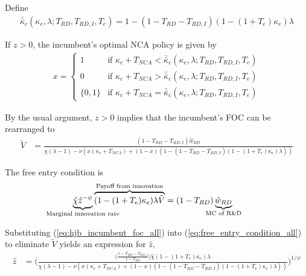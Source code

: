 \documentclass[11pt,english]{article}
\begin{document}
Define
\begin{align}
\bar{\bar{\kappa}}_c(\kappa_e,\lambda;T_{RD},T_{RD,I},T_e) = 1 - (1-T_{RD} - T_{RD,I})(1-(1+T_e)\kappa_e)\lambda  \label{eq:barkappa_all}
\end{align} 

If $z > 0$, the incumbent's optimal NCA policy is given by 
\begin{align}
x = \begin{cases}
1 & \textrm{if } \kappa_{c} + T_{NCA} < \bar{\bar{\kappa}}_c (\kappa_e, \lambda;T_{RD},T_{RD,I},T_e)\\
0 & \textrm{if } \kappa_{c} + T_{NCA} > \bar{\bar{\kappa}}_c (\kappa_e, \lambda;T_{RD},T_{RD,I},T_e)\\
\{0,1\} & \textrm{if } \kappa_c + T_{NCA} = \bar{\bar{\kappa}}_c (\kappa_e, \lambda;T_{RD},T_{RD,I},T_e)
\end{cases} \label{eq:nca_policy_all}
\end{align}


By the usual argument, $z > 0$ implies that the incumbent's FOC can be rearranged to
\begin{align}
\tilde{V} &= \frac{(1-T_{RD} - T_{RD,I})\hat{w}_{RD}}{\chi(\lambda -1) - \nu (x(\kappa_c + T_{NCA}) + (1-x)(1 - (1-T_{RD} - T_{RD,I})(1-(1+T_e)\kappa_e)\lambda)) } \label{eq:hjb_incumbent_foc_all}
\end{align}

The free entry condition is
\begin{align}
\underbrace{\hat{\chi} \hat{z}^{-\psi}}_{\mathclap{\text{Marginal innovation rate}}} \overbrace{(1-(1+T_e)\kappa_e) \lambda \tilde{V}}^{\mathclap{\text{Payoff from innovation}}} &= (1-T_{RD})\underbrace{\hat{w}_{RD}}_{\mathclap{\text{MC of R\&D}}} \label{eq:free_entry_condition_all}
\end{align}

Substituting (\ref{eq:hjb_incumbent_foc_all}) into (\ref{eq:free_entry_condition_all}) to eliminate $\tilde{V}$ yields an expression for $\hat{z}$, 
\begin{align}
\hat{z} &= \Bigg( \frac{\Big(\frac{1-T_{RD} -T_{RD,I}}{1-T_{RD}} \Big)\hat{\chi} (1-(1+T_e)\kappa_{e}) \lambda}{\chi(\lambda -1) - \nu (x(\kappa_c + T_{NCA}) + (1-x)(1 - (1-T_{RD} - T_{RD,I})(1-(1+T_e)\kappa_e)\lambda)) } \Bigg)^{1/\psi} \label{eq:effort_entrant_all}
\end{align}
\end{document}
